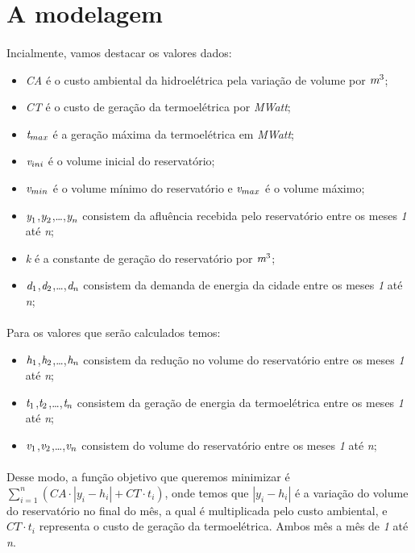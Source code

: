 \documentclass{article}
\begin{document}
\section{A modelagem}
\paragraph{} Incialmente, vamos destacar os valores dados:
\begin{itemize}
    \item \emph{CA} é o custo ambiental da hidroelétrica pela variação de volume por $\emph{m}^3$;
    \item \emph{CT} é o custo de geração da termoelétrica por \emph{MWatt};
    \item $\emph{t}_{max}$ é a geração máxima da termoelétrica em \emph{MWatt};
    \item $\emph{v}_{ini}$ é o volume inicial do reservatório;
    \item $\emph{v}_{min}$ é o volume mínimo do reservatório e $\emph{v}_{max}$ é o volume máximo;
    \item $\emph{y}_1$,$\emph{y}_2$,\dots,$\emph{y}_n$ consistem da afluência recebida pelo reservatório entre os meses \emph{1} até \emph{n};
    \item \emph{k} é a constante de geração do reservatório por $\emph{m}^3$;
    \item $\emph{d}_1$,$\emph{d}_2$,\dots,$\emph{d}_n$ consistem da demanda de energia da cidade entre os meses \emph{1} até \emph{n};
\end{itemize}
\paragraph{} Para os valores que serão calculados temos:
\begin{itemize}
    \item $\emph{h}_1$,$\emph{h}_2$,\dots,$\emph{h}_n$ consistem da redução no volume do reservatório entre os meses \emph{1} até \emph{n};
    \item $\emph{t}_1$,$\emph{t}_2$,\dots,$\emph{t}_n$ consistem da geração de energia da termoelétrica entre os meses \emph{1} até \emph{n};
    \item $\emph{v}_1$,$\emph{v}_2$,\dots,$\emph{v}_n$ consistem do volume do reservatório entre os meses \emph{1} até \emph{n};
\end{itemize}
\paragraph{} Desse modo, a função objetivo que queremos minimizar é \emph{$\sum_{i=1}^{n} (CA \cdot | y_{i} - h_{i} | + CT \cdot t_{i})$}, onde temos que \emph{$|y_{i} - h_{i}|$} é a variação do volume do reservatório no final do mês, a qual é multiplicada pelo custo ambiental, e $CT \cdot t_{i}$ representa o custo de geração da termoelétrica. Ambos mês a mês de \emph{1} até \emph{n}.
\end{document}
